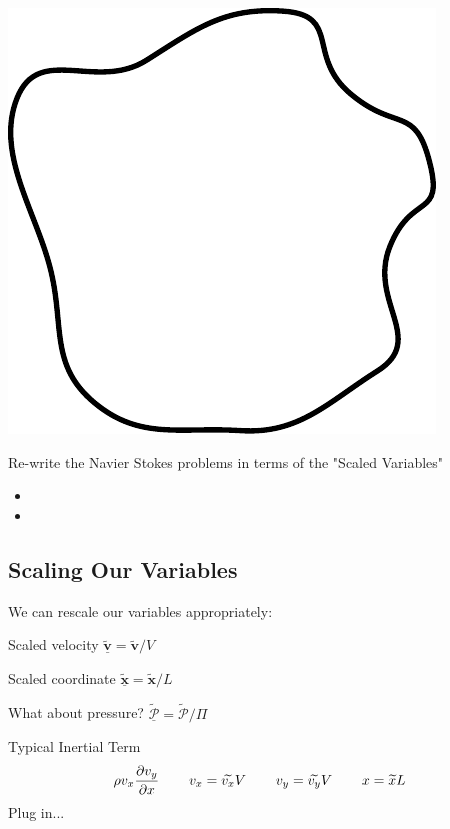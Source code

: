 \documentclass[paper=a4, fontsize=12pt]{scrartcl} %
\numberwithin{equation}{section} %
\numberwithin{figure}{section} %
\numberwithin{table}{section} %
\begin{document}
\hspace*{6cm} \includegraphics[scale=0.5]{drawing.pdf}

 Re-write the Navier Stokes problems in terms of the "Scaled Variables"
  \begin{itemize}
  \item 
  \item 
\end{itemize}
\newpage

\subsection*{Scaling Our Variables}
We can rescale our variables appropriately: 

Scaled velocity $\widetilde{\underline{\mathbf{v}}}=\widetilde{\mathbf{v}}/V$

\vspace{5ex}Scaled coordinate $\widetilde{\underline{\mathbf{x}}}=\widetilde{\mathbf{x}}/L$

\vspace{5ex} What about pressure? $\widetilde{\underline{\mathcal{P}}}=\widetilde{\mathcal{P}}/\Pi$


\vspace{5ex} Typical Inertial Term
\vspace{2ex} \begin{equation*}
\rho v_x \frac{\partial v_y}{\partial x} \hspace{5ex} v_x=\widetilde{v_x}V
\hspace{5ex} v_y=\widetilde{v_y}V
\hspace{5ex} x=\widetilde{x}L
\end{equation*}
Plug in...
\end{document}

